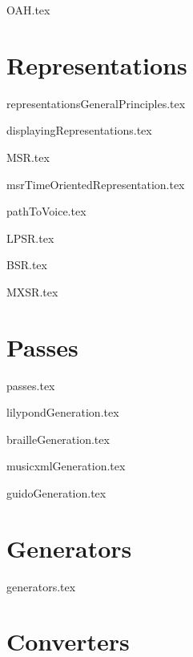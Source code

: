 \documentclass[11pt,a4paper]{report}
\begin{document}
{OAH.tex}


\part{Representations}

{representationsGeneralPrinciples.tex}

{displayingRepresentations.tex}

{MSR.tex}

{msrTimeOrientedRepresentation.tex}

{pathToVoice.tex}

{LPSR.tex}

{BSR.tex}

{MXSR.tex}


\part{Passes}

{passes.tex}

{lilypondGeneration.tex}

{brailleGeneration.tex}

{musicxmlGeneration.tex}

{guidoGeneration.tex}


\part{Generators}

{generators.tex}


\part{Converters}
\end{document}
